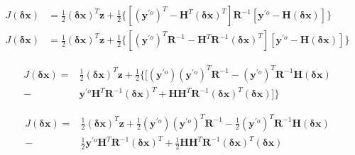 
\begin{align}
\label{apII_eq:4}
J(\mathbf{\delta{x}}) & = \frac{1}{2}(\mathbf{\delta{x}})^{T}\mathbf{z} + 
\frac{1}{2} \lbrace [(\mathbf{y}^{\prime{o}})^{T} - \mathbf{H}^{T}(\mathbf{\delta{x}})^{T}] \mathbf{R}^{-1}[\mathbf{y}^{\prime{o}} - \mathbf{H}(\mathbf{\delta{x}})] \rbrace \\
\label{apII_eq:5}
J(\mathbf{\delta{x}}) & = \frac{1}{2}(\mathbf{\delta{x}})^{T}\mathbf{z} + 
\frac{1}{2} \lbrace [(\mathbf{y}^{\prime{o}})^{T}\mathbf{R}^{-1} - \mathbf{H}^{T}\mathbf{R}^{-1}(\mathbf{\delta{x}})^{T}] [\mathbf{y}^{\prime{o}} - \mathbf{H}(\mathbf{\delta{x}})] \rbrace
\end{align}

\begin{equation}
\label{apII_eq:6}
\begin{aligned}
J(\mathbf{\delta{x}}) = {} & \frac{1}{2}(\mathbf{\delta{x}})^{T}\mathbf{z} + 
\frac{1}{2}
\lbrace [
(\mathbf{y}^{\prime{o}})(\mathbf{y}^{\prime{o}})^{T}\mathbf{R}^{-1} -
(\mathbf{y}^{\prime{o}})^{T}\mathbf{R}^{-1}\mathbf{H}(\mathbf{\delta{x}}) \\ - 
& \mathbf{y}^{\prime{o}}\mathbf{H}^{T}\mathbf{R}^{-1}(\mathbf{\delta{x}})^{T} +
\mathbf{H}\mathbf{H}^{T}\mathbf{R}^{-1}(\mathbf{\delta{x}})^{T}(\mathbf{\delta{x}})
] \rbrace
\end{aligned}
\end{equation}

\begin{equation}
\label{apII_eq:7}
  \begin{aligned}
J(\mathbf{\delta{x}}) = {} & \frac{1}{2}(\mathbf{\delta{x}})^{T}\mathbf{z} + 
\frac{1}{2}(\mathbf{y}^{\prime{o}})(\mathbf{y}^{\prime{o}})^{T}\mathbf{R}^{-1} -
\frac{1}{2}(\mathbf{y}^{\prime{o}})^{T}\mathbf{R}^{-1}\mathbf{H}(\mathbf{\delta{x}}) \\ - 
& \frac{1}{2}\mathbf{y}^{\prime{o}}\mathbf{H}^{T}\mathbf{R}^{-1}(\mathbf{\delta{x}})^{T} +
\frac{1}{2}\mathbf{H}\mathbf{H}^{T}\mathbf{R}^{-1}(\mathbf{\delta{x}})^{T}(\mathbf{\delta{x}})
  \end{aligned}
\end{equation}

